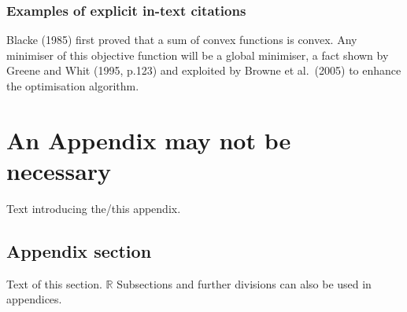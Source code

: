 \documentclass[a4paper, 12pt, notitlepage]{report}
\begin{document}
\subsection{Examples of explicit in-text citations}
%
Blacke (1985) first proved that a sum of convex functions is convex. Any minimiser of this objective function will be a global minimiser, a fact shown by Greene and Whit (1995, p.123) and exploited by Browne et al.\ (2005) to enhance the optimisation algorithm.

\appendix
\chapter{An Appendix may not be necessary}
%
Text introducing the/this appendix.

\section{Appendix section}
%
Text of this section.
$\mathbb{R}$
Subsections and further divisions can also be used in appendices.


 { }

%
\end{document}
